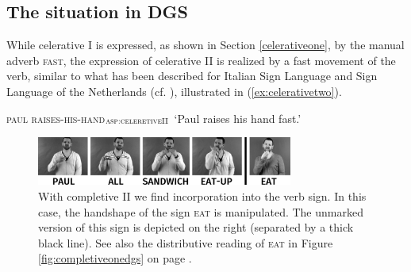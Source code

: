 \noindent 






\subsection{The situation in DGS}

While celerative I is expressed, as shown in Section \ref{celerativeone}, by the manual adverb \textsc{fast}, the expression of celerative II is realized by a fast movement of the verb, similar to what has been described for Italian Sign Language and Sign Language of the Netherlands (cf. \citealt{brunelli2011antisymmetry}), illustrated in (\ref{ex:celerativetwo}).

\begin{exe}
\ex\label{ex:celerativetwo}

{\textsc{paul raises-his-hand}$_{\textsc{asp:celeretiveII}}$}     
\glt `Paul raises his hand fast.'
\end{exe}


\begin{figure}[bt]
\centering
	\includegraphics[width=0.75\textwidth]{aufessensw.jpg}
	\caption{With completive II we find incorporation into the verb sign. In this case, the handshape of the sign \textsc{eat} is manipulated. The unmarked version of this sign is depicted on the right (separated by a thick black line). See also the distributive reading of \textsc{eat} in Figure \ref{fig:completiveonedgs} on page \pageref{fig:completiveonedgs}.}
	\label{labelfigure}
\end{figure}

